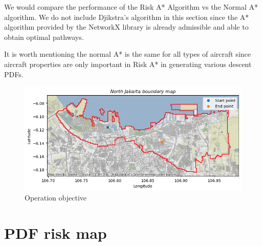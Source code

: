 \documentclass[12pt]{report}
\begin{document}
    We would compare the performance of the Risk A* Algorithm vs the Normal A* algorithm. We do not include Djikstra's
    algorithm in this section since the A* algorithm provided by the NetworkX library is already admissible and able to
    obtain optimal pathways.
        
    It is worth mentioning the normal A* is the same for all types of aircraft since aircraft properties are only
    important in Risk A* in generating various descent PDFs.

    \begin{figure}[H]
        \centering
        \includegraphics[width=\textwidth]{Plot/route.png}
        \caption{Operation objective}
        \label{fig:map}
    \end{figure}

    \section{PDF risk map}
\end{document}
